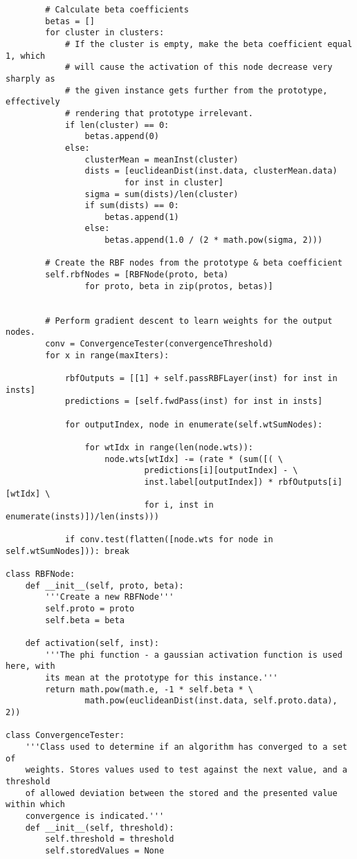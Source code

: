 \documentclass{article}
\begin{document}
\begin{verbatim}
        # Calculate beta coefficients
        betas = []
        for cluster in clusters:
            # If the cluster is empty, make the beta coefficient equal 1, which
            # will cause the activation of this node decrease very sharply as
            # the given instance gets further from the prototype, effectively
            # rendering that prototype irrelevant.
            if len(cluster) == 0:
                betas.append(0)
            else:
                clusterMean = meanInst(cluster)
                dists = [euclideanDist(inst.data, clusterMean.data)
                        for inst in cluster]
                sigma = sum(dists)/len(cluster)
                if sum(dists) == 0:
                    betas.append(1)
                else:
                    betas.append(1.0 / (2 * math.pow(sigma, 2)))

        # Create the RBF nodes from the prototype & beta coefficient
        self.rbfNodes = [RBFNode(proto, beta)
                for proto, beta in zip(protos, betas)]


        # Perform gradient descent to learn weights for the output nodes.
        conv = ConvergenceTester(convergenceThreshold)
        for x in range(maxIters):

            rbfOutputs = [[1] + self.passRBFLayer(inst) for inst in insts]
            predictions = [self.fwdPass(inst) for inst in insts]

            for outputIndex, node in enumerate(self.wtSumNodes):

                for wtIdx in range(len(node.wts)):
                    node.wts[wtIdx] -= (rate * (sum([( \
                            predictions[i][outputIndex] - \
                            inst.label[outputIndex]) * rbfOutputs[i][wtIdx] \
                            for i, inst in enumerate(insts)])/len(insts)))

            if conv.test(flatten([node.wts for node in self.wtSumNodes])): break

class RBFNode:
    def __init__(self, proto, beta):
        '''Create a new RBFNode'''
        self.proto = proto
        self.beta = beta

    def activation(self, inst):
        '''The phi function - a gaussian activation function is used here, with
        its mean at the prototype for this instance.'''
        return math.pow(math.e, -1 * self.beta * \
                math.pow(euclideanDist(inst.data, self.proto.data), 2))

class ConvergenceTester:
    '''Class used to determine if an algorithm has converged to a set of
    weights. Stores values used to test against the next value, and a threshold
    of allowed deviation between the stored and the presented value within which
    convergence is indicated.'''
    def __init__(self, threshold):
        self.threshold = threshold
        self.storedValues = None


\end{verbatim}
\end{document}
